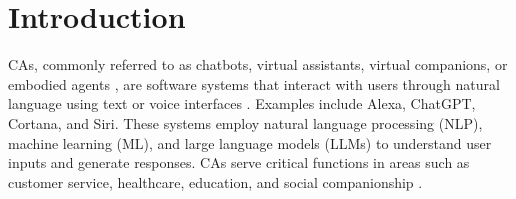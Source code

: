 \documentclass[sigconf,review,anonymous]{acmart}
\begin{document}



\maketitle

\section{Introduction}
\label{sec:introduction}


CAs, commonly referred to as chatbots, virtual assistants, virtual companions, or embodied agents \citep{klein_effects_2025}, are software systems that interact with users through natural language using text or voice interfaces \citep{diederich_conversational_2019}. Examples include Alexa, ChatGPT, Cortana, and Siri. These systems employ natural language processing (NLP), machine learning (ML), and large language models (LLMs) to understand user inputs and generate responses. CAs serve critical functions in areas such as customer service, healthcare, education, and social companionship \citep{araujo2018living,brandtzaeg2017people}.
\end{document}
